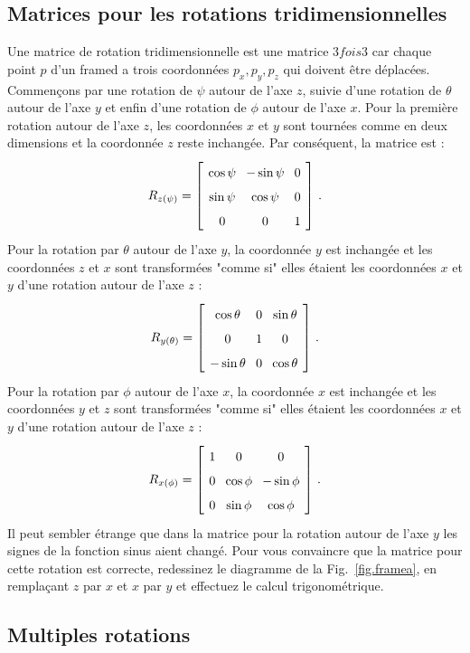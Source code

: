 \subsection{Matrices pour les rotations tridimensionnelles}

Une matrice de rotation tridimensionnelle est une matrice $3 fois 3$ car chaque point $p$ d'un framed a trois coordonnées $p_x,p_y,p_z$ qui doivent être déplacées. 
Commençons par une rotation de $\psi$ autour de l'axe $z$, suivie d'une rotation de $\theta$ autour de l'axe $y$ et enfin d'une rotation de $\phi$ autour de l'axe $x$. Pour la première rotation autour de l'axe $z$, les coordonnées $x$ et $y$ sont tournées comme en deux dimensions et la coordonnée $z$ reste inchangée. Par conséquent, la matrice est :
\[
\spacearray
R_{z(\psi)}=\left[\begin{array}{ccc}\cos\psi&-\sin\psi&0\\\sin\psi&\cos\psi&0\\0&0&1\end{array}\right]\,.
\]
Pour la rotation par $\theta$ autour de l'axe $y$, la coordonnée $y$ est inchangée et les coordonnées $z$ et $x$ sont transformées "comme si" elles étaient les coordonnées $x$ et $y$ d'une rotation autour de l'axe $z$ :
\[
\spacearray
R_{y(\theta)}=\left[\begin{array}{ccc}\cos\theta&0&\sin\theta\\0&1&0\\-\sin\theta&0&\cos\theta\\\end{array}\right]\,.
\]
Pour la rotation par $\phi$ autour de l'axe $x$, la coordonnée $x$ est inchangée et les coordonnées $y$ et $z$ sont transformées "comme si" elles étaient les coordonnées $x$ et $y$ d'une rotation autour de l'axe $z$ :
\[
\spacearray
R_{x(\phi)}=\left[\begin{array}{ccc}1&0&0\\0&\cos\phi&-\sin\phi\\0&\sin\phi&\cos\phi\\\end{array}\right]\,.
\]
Il peut sembler étrange que dans la matrice pour la rotation autour de l'axe $y$ les signes de la fonction sinus aient changé. Pour vous convaincre que la matrice pour cette rotation est correcte, redessinez le diagramme de la Fig.~\ref{fig.framea}, en remplaçant $z$ par $x$ et $x$ par $y$ et effectuez le calcul trigonométrique.

\subsection{Multiples rotations}

